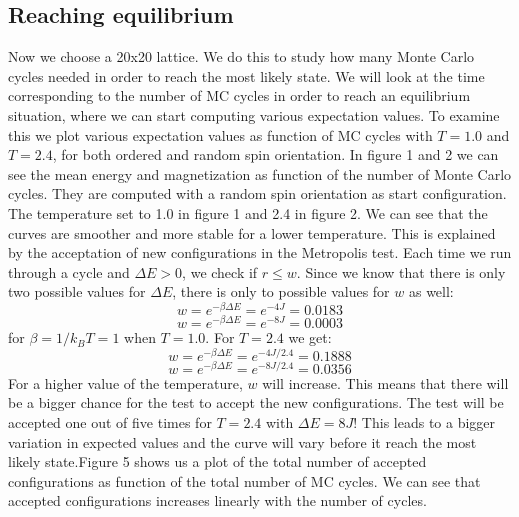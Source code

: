 \documentclass{article}
\begin{document}
\subsection*{Reaching equilibrium}
Now we choose a 20x20 lattice. We do this to study how many Monte Carlo cycles needed in order to reach the most likely state. We will look at the time corresponding to the number of MC cycles in order to reach an equilibrium situation, where we can start computing various expectation values. To examine this we plot various expectation values as function of MC cycles with $T = 1.0$ and $T =2.4$, for both ordered and random spin orientation. 
\newline \newline
In figure 1 and 2 we can see the mean energy and magnetization as function of the number of Monte Carlo cycles. They are computed with a random spin orientation as start configuration. The temperature set to 1.0 in figure 1 and 2.4 in figure 2. We can see that the curves are smoother and more stable for a lower temperature. This is explained by the acceptation of new configurations in the Metropolis test. Each time we run through a cycle and $\Delta E > 0$, we check if $r \leq w$. Since we know that there is only two possible values for $\Delta E$, there is only to possible values for $w$ as well:
$$ w = e^{-\beta \Delta E} = e ^{-4J} = 0.0183 $$
$$ w = e^{-\beta \Delta E} = e ^{-8J} = 0.0003 $$
for $\beta = 1/{k_B T} = 1 $ when $T =1.0$. 
\newline For $T = 2.4$ we get: 
$$ w = e^{-\beta \Delta E} = e ^{-4J/2.4} = 0.1888 $$
$$ w = e^{-\beta \Delta E} = e ^{-8J/2.4} = 0.0356 $$
For a higher value of the temperature, $w$ will increase. This means that there will be a bigger chance for the test to accept the new configurations. The test will be accepted one out of five times for $T =2.4$ with $\Delta E = 8J$! This leads to a bigger variation in expected values and the curve will vary before it reach the most likely state.\newline Figure 5 shows us a plot of the total number of accepted configurations as function of the total number of MC cycles. We can see that accepted configurations increases linearly with the number of cycles. 
\end{document}
